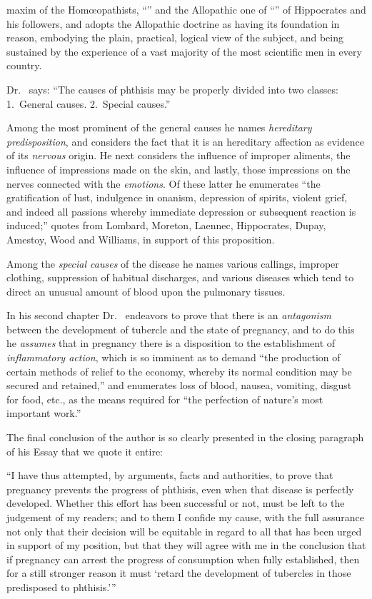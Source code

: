 maxim of the Homœopathists, ``'' and the
Allopathic one of ``'' of Hippocrates
and his followers, and adopts the Allopathic doctrine as having its
foundation in reason, embodying the plain, practical, logical view of
the subject, and being sustained by the experience of a vast majority of
the most scientific men in every country.

Dr.\  says: ``The causes of phthisis may be properly divided
into two classes:   1.~General causes. 2.~Special causes.''

Among the most prominent of the general causes he names \emph{hereditary
predisposition}, and considers the fact that it is an hereditary
affection as  evidence of its \emph{nervous} origin. He next considers
the influence of improper aliments, the influence of impressions
made on the skin, and lastly, those impressions on the nerves connected
with the \emph{emotions}. Of these latter he enumerates ``the gratification
of lust, indulgence in onanism, depression of spirits, violent grief, and
indeed all passions whereby immediate depression or subsequent reaction
is induced;'' quotes from Lombard, Moreton, Laennec, Hippocrates,
Dupay, Amestoy, Wood and Williams, in support of this proposition.

Among the \emph{special causes} of the disease he names various callings,
improper clothing, suppression of habitual discharges, and various diseases
which tend to direct an unusual amount of blood upon the pulmonary tissues.

In his second chapter Dr.\  endeavors to prove that there is
an \emph{antagonism} between the development of tubercle and the state of
pregnancy, and to do this he \emph{assumes} that in pregnancy there is a disposition
to the establishment of \emph{inflammatory action}, which is so imminent
as to demand ``the production of certain methods of relief to the
economy, whereby its normal condition may be secured and retained,''
and enumerates loss of blood, nausea, vomiting, disgust for food, etc., as
the means required for ``the perfection of nature's most important work.''

The final conclusion of the author is so clearly presented in the closing
paragraph of his Essay that we quote it entire:

``I have thus attempted, by arguments, facts and authorities, to
prove that pregnancy prevents the progress of phthisis, even when that
disease is perfectly developed. Whether this effort has been successful
or not, must be left to the judgement of my readers; and to them I
confide my cause, with the full assurance not only that their decision
will be equitable in regard to all that has been urged in support of my
position, but that they will agree with me in the conclusion that if
pregnancy can arrest the progress of consumption when fully established,
then for a still stronger reason it must `retard the development of
tubercles in those predisposed to phthisis.'\thinspace{}'' \endinput
